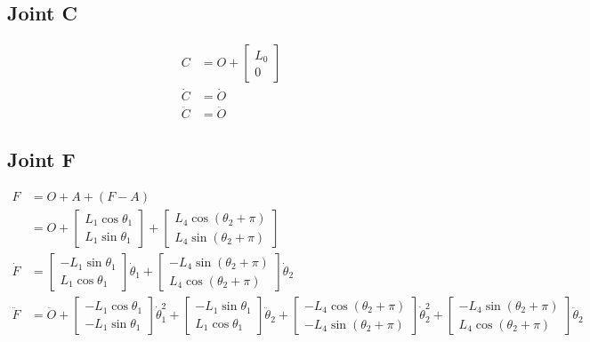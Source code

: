 \documentclass[letterpaper]{article}
\begin{document}
\subsection{Joint C}
 
\begin{align*}
	C &= O + \begin{bmatrix} L_0 \\ 0 \end{bmatrix} \\
	\dot{C} &= \dot{O} \\
	\ddot{C} &= \ddot{O}
\end{align*}

\subsection{Joint F}

\begin{align*}
	F &= O + A + (F-A) \\
	  &= O + \begin{bmatrix} L_1 \cos \theta_1 \\ L_1 \sin \theta_1 \end{bmatrix} + \begin{bmatrix} L_4 \cos(\theta_2 + \pi) \\ L_4 \sin(\theta_2 + \pi) \end{bmatrix} \\
	\dot{F} &= \begin{bmatrix} -L_1 \sin \theta_1 \\ L_1 \cos \theta_1 \end{bmatrix} \dot{\theta}_1 + \begin{bmatrix} - L_4 \sin(\theta_2 + \pi) \\ L_4 \cos(\theta_2 + \pi) \end{bmatrix} \dot{\theta}_2 \\
	\ddot{F} &= \ddot{O} + \begin{bmatrix} -L_1 \cos \theta_1 \\ -L_1 \sin \theta_1 \end{bmatrix} \dot{\theta}_1^2 
		+ \begin{bmatrix} -L_1 \sin \theta_1 \\ L_1 \cos \theta_1 \end{bmatrix} \ddot{\theta}_2 
		+ \begin{bmatrix} -L_4 \cos(\theta_2 + \pi) \\ -L_4 \sin(\theta_2 + \pi) \end{bmatrix} \dot{\theta}_2^2 
		+ \begin{bmatrix} -L_4 \sin(\theta_2 + \pi) \\ L_4 \cos(\theta_2 + \pi) \end{bmatrix} \ddot{\theta}_2
\end{align*}
\end{document}
